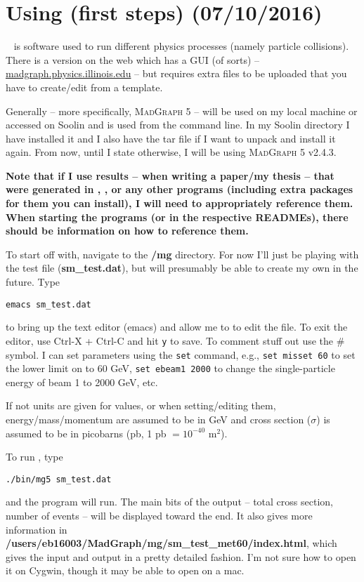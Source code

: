\newpage
\chapter{Using \madgraph (first steps) (07/10/2016)}

\madgraph~\cite{Alwall:2011madgraph} is software used to run different physics processes (namely particle collisions). There is a version on the web which has a GUI (of sorts) -- \url{madgraph.physics.illinois.edu} -- but requires extra files to be uploaded that you have to create/edit from a template.

Generally \madgraph -- more specifically, \textsc{MadGraph 5} -- will be used on my local machine or accessed on Soolin and is used from the command line. In my Soolin directory I have installed it and I also have the tar file if I want to unpack and install it again. From now, until I state otherwise, I will be using \textsc{MadGraph 5} v2.4.3.

\textbf{Note that if I use results -- when writing a paper/my thesis -- that were generated in \madgraph, \madanalysis, \ROOT or any other programs (including extra packages for them you can install), I will need to appropriately reference them. When starting the programs (or in the respective READMEs), there should be information on how to reference them.}

To start off with, navigate to the \textbf{/mg} directory. For now I'll just be playing with the test file (\textbf{sm\_test.dat}), but will presumably be able to create my own in the future. Type

\texttt{emacs sm\_test.dat}

to bring up the text editor (emacs) and allow me to to edit the file. To exit the editor, use Ctrl-X + Ctrl-C and hit \texttt{y} to save. To comment stuff out use the \# symbol. I can set parameters using the \texttt{set} command, e.g., \texttt{set misset 60} to set the lower limit on \etmiss to 60 GeV, \texttt{set ebeam1 2000} to change the single-particle energy of beam 1 to 2000 GeV, etc.

If not units are given for values, or when setting/editing them, energy/mass/momentum are assumed to be in GeV and cross section ($\sigma$) is assumed to be in picobarns (pb, 1 pb $= 10^{-40}$ m$^2$).

To run \madgraph, type

\texttt{./bin/mg5 sm\_test.dat}

and the program will run. The main bits of the output -- total cross section, number of events -- will be displayed toward the end. It also gives more information in \textbf{/users/eb16003/MadGraph/mg/sm\_test\_met60/index.html}, which gives the input and output in a pretty detailed fashion. I'm not sure how to open it on Cygwin, though it may be able to open on a mac.

